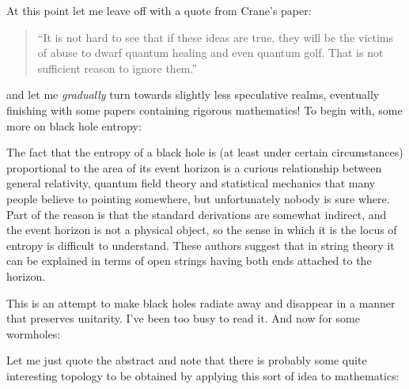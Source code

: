 \documentclass[12pt]{article}
\def\tightlist{}
\renewcommand{\texttt}[1]{%
  \begingroup
  \ttfamily
  \begingroup\lccode`~=`/\lowercase{\endgroup\def~}{/\discretionary{}{}{}}%
  \begingroup\lccode`~=`[\lowercase{\endgroup\def~}{[\discretionary{}{}{}}%
  \begingroup\lccode`~=`.\lowercase{\endgroup\def~}{.\discretionary{}{}{}}%
  \catcode`/=\active\catcode`[=\active\catcode`.=\active
  \scantokens{#1\noexpand}%
  \endgroup
}
\begin{document}
At this point let me leave off with a quote from Crane's paper:

\begin{quote}
``It is not hard to see that if these ideas are true, they will be the
victims of abuse to dwarf quantum healing and even quantum golf. That is
not sufficient reason to ignore them.''
\end{quote}
\noindent
and let me \emph{gradually} turn towards slightly less speculative
realms, eventually finishing with some papers containing rigorous
mathematics! To begin with, some more on black hole entropy:

\noindent
The fact that the entropy of a black hole is (at least under certain
circumstances) proportional to the area of its event horizon is a
curious relationship between general relativity, quantum field theory
and statistical mechanics that many people believe to pointing
somewhere, but unfortunately nobody is sure where. Part of the reason is
that the standard derivations are somewhat indirect, and the event
horizon is not a physical object, so the sense in which it is the locus
of entropy is difficult to understand. These authors suggest that in
string theory it can be explained in terms of open strings having both
ends attached to the horizon.

\noindent
This is an attempt to make black holes radiate away and disappear in a
manner that preserves unitarity. I've been too busy to read it. And now
for some wormholes:

\noindent
Let me just quote the abstract and note that there is probably some
quite interesting topology to be obtained by applying this sort of idea
to mathematics:
\end{document}
